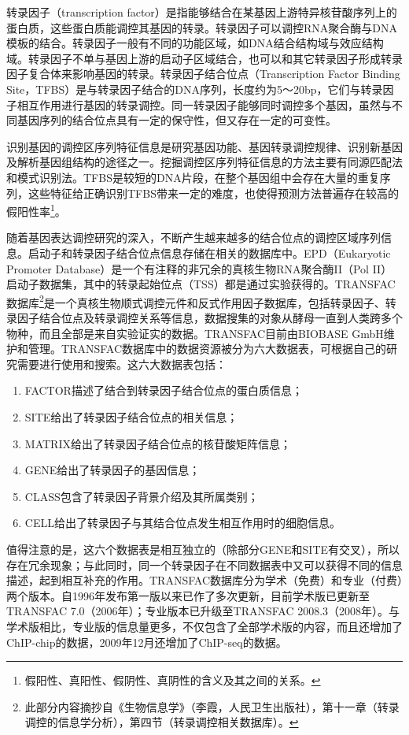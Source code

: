 \documentclass[11pt,a4paper,twoside]{book}
\begin{document}
转录因子（transcription factor）是指能够结合在某基因上游特异核苷酸序列上的蛋白质，这些蛋白质能调控其基因的转录。转录因子可以调控RNA聚合酶与DNA模板的结合。转录因子一般有不同的功能区域，如DNA结合结构域与效应结构域。转录因子不单与基因上游的启动子区域结合，也可以和其它转录因子形成转录因子复合体来影响基因的转录。转录因子结合位点（Transcription Factor Binding Site，TFBS）是与转录因子结合的DNA序列，长度约为5～20bp，它们与转录因子相互作用进行基因的转录调控。同一转录因子能够同时调控多个基因，虽然与不同基因序列的结合位点具有一定的保守性，但又存在一定的可变性。

识别基因的调控区序列特征信息是研究基因功能、基因转录调控规律、识别新基因及解析基因组结构的途径之一。挖掘调控区序列特征信息的方法主要有同源匹配法和模式识别法。TFBS是较短的DNA片段，在整个基因组中会存在大量的重复序列，这些特征给正确识别TFBS带来一定的难度，也使得预测方法普遍存在较高的假阳性率\footnote{假阳性、真阳性、假阴性、真阴性的含义及其之间的关系。}。

随着基因表达调控研究的深入，不断产生越来越多的结合位点的调控区域序列信息。启动子和转录因子结合位点信息存储在相关的数据库中。EPD（Eukaryotic Promoter Database）是一个有注释的非冗余的真核生物RNA聚合酶II（Pol II）启动子数据集，其中的转录起始位点（TSS）都是通过实验获得的。TRANSFAC数据库\footnote{此部分内容摘抄自《生物信息学》（李霞，人民卫生出版社），第十一章（转录调控的信息学分析），第四节（转录调控相关数据库）。}是一个真核生物顺式调控元件和反式作用因子数据库，包括转录因子、转录因子结合位点及转录调控关系等信息，数据搜集的对象从酵母一直到人类跨多个物种，而且全部是来自实验证实的数据。TRANSFAC目前由BIOBASE GmbH维护和管理。TRANSFAC数据库中的数据资源被分为六大数据表，可根据自己的研究需要进行使用和搜索。这六大数据表包括：
\begin{enumerate}
  \item FACTOR描述了结合到转录因子结合位点的蛋白质信息；
  \item SITE给出了转录因子结合位点的相关信息；
  \item MATRIX给出了转录因子结合位点的核苷酸矩阵信息；
  \item GENE给出了转录因子的基因信息；
  \item CLASS包含了转录因子背景介绍及其所属类别；
  \item CELL给出了转录因子与其结合位点发生相互作用时的细胞信息。
\end{enumerate}
值得注意的是，这六个数据表是相互独立的（除部分GENE和SITE有交叉），所以存在冗余现象；与此同时，同一个转录因子在不同数据表中又可以获得不同的信息描述，起到相互补充的作用。TRANSFAC数据库分为学术（免费）和专业（付费）两个版本。自1996年发布第一版以来已作了多次更新，目前学术版已更新至TRANSFAC 7.0（2006年）；专业版本已升级至TRANSFAC 2008.3（2008年）。与学术版相比，专业版的信息量更多，不仅包含了全部学术版的内容，而且还增加了ChIP-chip的数据，2009年12月还增加了ChIP-seq的数据。
\end{document}
